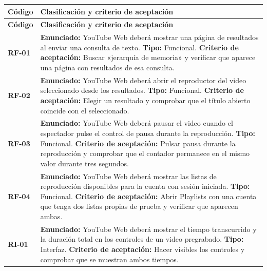 \documentclass[11pt,a4paper]{article}
\renewcommand{\arraystretch}{1.23}
\begin{document}
\begingroup
\small
\setlength{\tabcolsep}{4pt}
\renewcommand{\arraystretch}{1.25}
\begin{longtable}{|p{}|p{}|}
\hline\rowcolor{gray!15}\textbf{Código} & \textbf{Clasificación y criterio de aceptación} \\ \hline
\endfirsthead
\hline\rowcolor{gray!15}\textbf{Código} & \textbf{Clasificación y criterio de aceptación} \\ \hline
\endhead
\textbf{RF-01} & \textbf{Enunciado:} YouTube Web deberá mostrar una página de resultados al enviar una consulta de texto.\newline
\textbf{Tipo:} Funcional.\newline
\textbf{Criterio de aceptación:} Buscar «jerarquía de memoria» y verificar que aparece una página con resultados de esa consulta. \\ \hline
\textbf{RF-02} & \textbf{Enunciado:} YouTube Web deberá abrir el reproductor del video seleccionado desde los resultados.\newline
\textbf{Tipo:} Funcional.\newline
\textbf{Criterio de aceptación:} Elegir un resultado y comprobar que el título abierto coincide con el seleccionado. \\ \hline
\textbf{RF-03} & \textbf{Enunciado:} YouTube Web deberá pausar el video cuando el espectador pulse el control de pausa durante la reproducción.\newline
\textbf{Tipo:} Funcional.\newline
\textbf{Criterio de aceptación:} Pulsar pausa durante la reproducción y comprobar que el contador permanece en el mismo valor durante tres segundos. \\ \hline
\textbf{RF-04} & \textbf{Enunciado:} YouTube Web deberá mostrar las listas de reproducción disponibles para la cuenta con sesión iniciada.\newline
\textbf{Tipo:} Funcional.\newline
\textbf{Criterio de aceptación:} Abrir Playlists con una cuenta que tenga dos listas propias de prueba y verificar que aparecen ambas. \\ \hline
\textbf{RI-01} & \textbf{Enunciado:} YouTube Web deberá mostrar el tiempo transcurrido y la duración total en los controles de un video pregrabado.\newline
\textbf{Tipo:} Interfaz.\newline
\textbf{Criterio de aceptación:} Hacer visibles los controles y comprobar que se muestran ambos tiempos. \\ \hline

\end{longtable}
\end{document}
